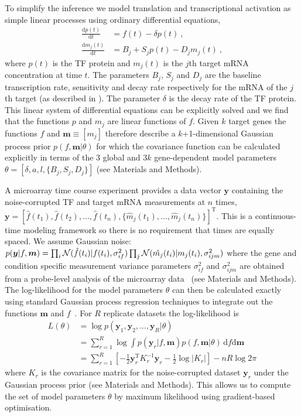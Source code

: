 \documentclass{pnastwo}
\begin{document}
\begin{article}
To simplify the inference we model translation and transcriptional
activation as simple linear processes using ordinary differential
equations,
\begin{align}
  \frac{\mathrm{d}p(t)}{\mathrm{d}t} & = f(t) - \delta
  p(t) \ , \label{eq:translation_ode} \\
  \frac{\mathrm{d}m_j(t)}{\mathrm{d}t} & = B_j+S_j p(t)-D_j m_j(t) \ , \label{eq:transcription_ode}
\end{align}
where $p(t)$ is the TF protein and $m_j(t)$ is the $j$th target mRNA
concentration at time $t$. The parameters $B_j$, $S_j$ and $D_j$ are the
baseline transcription rate, sensitivity and decay rate respectively
for the mRNA of the $j$th target (as described in \cite{Barenco2006a}).
The parameter $\delta$ is the decay rate of the TF protein.
This linear system of differential equations can be
explicitly solved and we find that the functions $p$ and $m_j$ are
linear functions of $f$. Given $k$ target genes the functions $f$ and $\bm m\equiv[m_j]$ therefore
describe a $k$+1-dimensional Gaussian process prior $p(f,\bm m|\theta)$
for which the covariance function can be calculated explicitly in terms of the
$3$ global and $3k$ gene-dependent model parameters
$\theta=[\delta,a,l,\{B_j,S_j,D_j\}]$ (see Materials and Methods). 

A microarray time course experiment provides a data vector $\bm y$ containing the noise-corrupted TF and target mRNA
measurements at $n$ times,
$\bm
y=[\hat{f}(t_1),\hat{f}(t_2),\ldots,\hat{f}(t_n),\{\hat{m}_j(t_1),\ldots,\hat{m}_j(t_n)\}]^\mathrm{T}$. This
is a continuous-time modeling framework so there is no
requirement that times are equally spaced. We assume Gaussian noise:
$p(\bm y|f,\bm m)=\prod_i{\cal
  N}(\hat{f}(t_i)|f(t_i),\sigma_{if}^2)\prod_j{\cal
  N}(\hat{m_j}(t_i)|m_j(t_i),\sigma_{ijm}^2)$ where the gene and condition
specific measurement variance parameters $\sigma_{if}^2$ and
$\sigma_{ijm}^2$ are obtained from a probe-level analysis of the
microarray data~\cite{Liu2005,Pearson2009} (see
Materials and Methods). The log-likelihood for the model parameters
$\theta$ can then be calculated exactly using standard Gaussian process regression
techniques to integrate out the functions $\bm m$ and
$f$~\cite{Rasmussen2006}. For $R$ replicate datasets the
log-likelihood is
\begin{equation*}
  \begin{split}
    L(\theta) & = \log p(\bm y_1,\bm y_2,\ldots,\bm y_{R}|\theta) \\
    & = \sum_{r=1}^{R} \log \!\int 
    \!\!p(\bm y_r|f,\bm m)p(f,\bm m|\theta) \, \mathrm{d}\!f\mathrm{d}\bm m\\
    & = \sum_{r=1}^{R} \left[-\frac{1}{2}\bm y_r^\mathrm{T} K_r^{-1} \bm y_r -
      \frac{1}{2}\log|K_r|\right] -nR\log 2\pi
  \end{split}
\end{equation*}
where $K_r$ is the covariance matrix for the
noise-corrupted dataset $\bm y_r$ under the Gaussian process prior (see
Materials and Methods). This allows us to compute the set of model
parameters $\theta$ by maximum
likelihood using gradient-based optimisation. 


\end{article}
\end{document}
